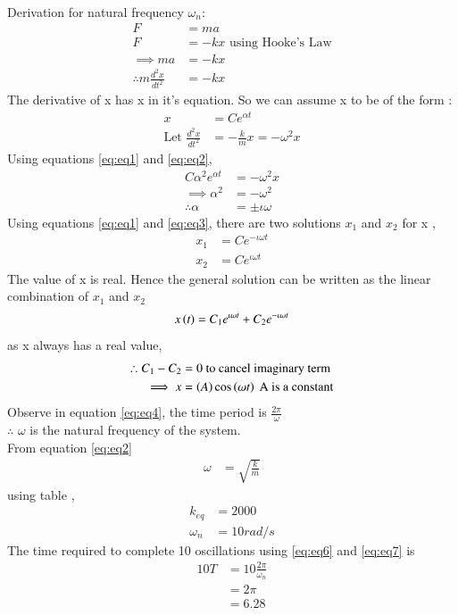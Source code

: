 \documentclass[journal,12pt,twocolumn]{IEEEtran}
\theoremstyle{remark}
\begin{document}
\solution\\

Derivation for natural frequency $\omega_n$:
\begin{align}
    F &= ma \\
    F &= -kx \text{ using Hooke's Law}\\
    \implies ma &= -kx\\
    \therefore m\frac{d^2x}{dt^2} &= -kx\label{eq:eq5}
\end{align}
The derivative of x has x in it's equation. So we can assume x to be of the form :
\begin{align}
    x &= Ce^{\alpha t} \label{eq:eq1}\\
    \text{Let } \frac{d^2x}{dt^2} &= -\frac{k}{m}x = -\omega^2 x \label{eq:eq2}
\end{align}
Using equations \eqref{eq:eq1} and \eqref{eq:eq2},
\begin{align}
    C\alpha^2 e^{\alpha t} &= -\omega^2 x\\
    \implies \alpha^2 &= -\omega^2\\
    \therefore \alpha &= \pm  \iota  \omega \label{eq:eq3}
\end{align}
Using equations \eqref{eq:eq1} and \eqref{eq:eq3}, there are two solutions $x_1$ and $x_2$ for x ,
\begin{align}
    x_1 &= Ce^{-\iota \omega t}\\
     x_2 &= Ce^{\iota \omega t}
\end{align}
The value of x is real. Hence the general solution can be written as the linear combination of $x_1$ and $x_2$ 
\begin{align}
    x\left(t\right) = C_1e^{\iota \omega t} + C_2e^{-\iota \omega t}
\end{align}
as x always has a real value,
\begin{align}
    \therefore C_1 - C_2 &= 0  \text{ to cancel imaginary term}\\
    \implies x  &= \left(A\right)\cos\left(\omega t\right)\label{eq:eq4} \text{ A is a constant}
\end{align}
Observe in equation \eqref{eq:eq4}, the time period is $\frac{2\pi}{\omega}$\\
$\therefore$ $\omega$ is the natural frequency of the system.\\
From equation \eqref{eq:eq2}
\begin{align}
    \omega &= \sqrt{\frac{k}{m}}
\end{align}
using table  ,
\begin{align}
    k_{eq} &= 2000 \label{eq:eq6}\\
    \omega_n &= 10 rad/s\label{eq:eq7}
\end{align}
The time required to complete 10 oscillations using \eqref{eq:eq6} and \eqref{eq:eq7} is \\
\begin{align}
    10T &= 10\frac{2\pi}{\omega_n}\\
    &= 2\pi\\
    &= 6.28
\end{align}
\end{document}

